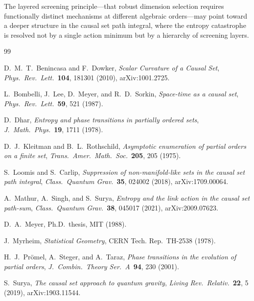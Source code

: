 \documentclass[12pt,a4paper]{article}
\begin{document}
The layered screening principle---that robust dimension selection requires
functionally distinct mechanisms at different algebraic orders---may point toward
a deeper structure in the causal set path integral, where the entropy catastrophe
is resolved not by a single action minimum but by a hierarchy of screening layers.


\begin{thebibliography}{99}

D.~M.~T.~Benincasa and F.~Dowker,
\emph{Scalar Curvature of a Causal Set},
\emph{Phys.\ Rev.\ Lett.}\ \textbf{104}, 181301 (2010),
arXiv:1001.2725.

L.~Bombelli, J.~Lee, D.~Meyer, and R.~D.~Sorkin,
\emph{Space-time as a causal set},
\emph{Phys.\ Rev.\ Lett.}\ \textbf{59}, 521 (1987).

D.~Dhar,
\emph{Entropy and phase transitions in partially ordered sets},
\emph{J.\ Math.\ Phys.}\ \textbf{19}, 1711 (1978).

D.~J.~Kleitman and B.~L.~Rothschild,
\emph{Asymptotic enumeration of partial orders on a finite set},
\emph{Trans.\ Amer.\ Math.\ Soc.}\ \textbf{205}, 205 (1975).

S.~Loomis and S.~Carlip,
\emph{Suppression of non-manifold-like sets in the causal set path integral},
\emph{Class.\ Quantum Grav.}\ \textbf{35}, 024002 (2018),
arXiv:1709.00064.

A.~Mathur, A.~Singh, and S.~Surya,
\emph{Entropy and the link action in the causal set path-sum},
\emph{Class.\ Quantum Grav.}\ \textbf{38}, 045017 (2021),
arXiv:2009.07623.

D.~A.~Meyer,
Ph.D.\ thesis, MIT (1988).

J.~Myrheim,
\emph{Statistical Geometry},
CERN Tech. Rep.\ TH-2538 (1978).

H.~J.~Pr\"omel, A.~Steger, and A.~Taraz,
\emph{Phase transitions in the evolution of partial orders},
\emph{J.\ Combin.\ Theory Ser.\ A}\ \textbf{94}, 230 (2001).

S.~Surya,
\emph{The causal set approach to quantum gravity},
\emph{Living Rev.\ Relativ.}\ \textbf{22}, 5 (2019),
arXiv:1903.11544.

\end{thebibliography}
\end{document}
